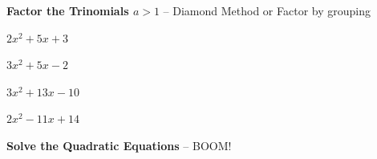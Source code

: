 \documentclass[11pt]{article}
\begin{document}
\hrulefill

\textbf{Factor the Trinomials $a>1$} -- Diamond Method or Factor by grouping\\

\begin{enumerate}[resume]
\begin{multicols}{2}

\item $2x^2+5x+3$\\

	\vspace{1cm}

\item $3x^2+5x-2$\\

	\vspace{1cm}

\item $3x^2+13x-10$\\

	\vspace{1cm}

\item $2x^2-11x+14$\\

	\vspace{1cm}

\end{multicols}
\end{enumerate}



\pagebreak

\textbf{Solve the Quadratic Equations} -- BOOM!
\end{document}
